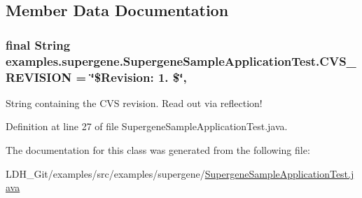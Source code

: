 \subsection{Member Data Documentation}
\hypertarget{classexamples_1_1supergene_1_1_supergene_sample_application_test_ab9449f9a3118b8b9d1ead38ccc27ad50}{
\subsubsection[{C\-V\-S\-\_\-\-R\-E\-V\-I\-S\-I\-O\-N}]{\setlength{\rightskip}{0pt plus 5cm}final String examples.\-supergene.\-Supergene\-Sample\-Application\-Test.\-C\-V\-S\-\_\-\-R\-E\-V\-I\-S\-I\-O\-N = \char`\"{}\$Revision\-: 1. \$\char`\"{}\hspace{0.3cm}{\ttfamily [static]}, {\ttfamily [private]}}}\label{classexamples_1_1supergene_1_1_supergene_sample_application_test_ab9449f9a3118b8b9d1ead38ccc27ad50}
String containing the C\-V\-S revision. Read out via reflection! 

Definition at line 27 of file Supergene\-Sample\-Application\-Test.\-java.



The documentation for this class was generated from the following file\-:\begin{DoxyCompactItemize}
\item 
L\-D\-H\-\_\-\-Git/examples/src/examples/supergene/\hyperlink{_supergene_sample_application_test_8java}{Supergene\-Sample\-Application\-Test.\-java}\end{DoxyCompactItemize}
